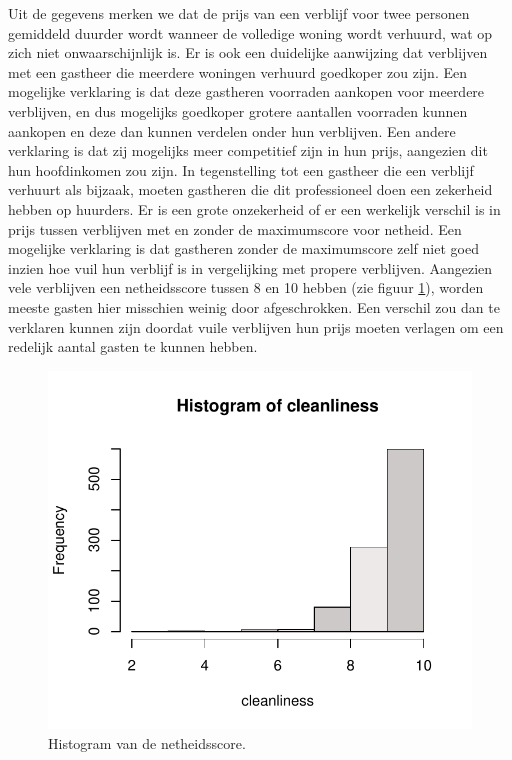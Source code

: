 \documentclass[a4paper]{kulakarticle}
\begin{document}
	Uit de gegevens merken we dat de prijs van een verblijf voor twee personen gemiddeld duurder wordt wanneer de volledige woning wordt verhuurd, wat op zich niet onwaarschijnlijk is.
	Er is ook een duidelijke aanwijzing dat verblijven met een gastheer die meerdere woningen verhuurd goedkoper zou zijn. Een mogelijke verklaring is dat deze gastheren voorraden aankopen voor meerdere verblijven, en dus mogelijks goedkoper grotere aantallen voorraden kunnen aankopen en deze dan kunnen verdelen onder hun verblijven. Een andere verklaring is dat zij mogelijks meer competitief zijn in hun prijs, aangezien dit hun hoofdinkomen zou zijn. In tegenstelling tot een gastheer die een verblijf verhuurt als bijzaak, moeten gastheren die dit professioneel doen een zekerheid hebben op huurders.
	Er is een grote onzekerheid of er een werkelijk verschil is in prijs tussen verblijven met en zonder de maximumscore voor netheid. Een mogelijke verklaring is dat gastheren zonder de maximumscore zelf niet goed inzien hoe vuil hun verblijf is in vergelijking met propere verblijven. Aangezien vele verblijven een netheidsscore tussen 8 en 10 hebben (zie figuur \ref{fig:cleanliness}), worden meeste gasten hier misschien weinig door afgeschrokken. Een verschil zou dan te verklaren kunnen zijn doordat vuile verblijven hun prijs moeten verlagen om een redelijk aantal gasten te kunnen hebben.
	
	\begin{figure}
		\centering
		\includegraphics{Figuren/cleanliness_hist.pdf}
		\caption{Histogram van de netheidsscore.}
		\label{fig:cleanliness}
	\end{figure}
	
\end{document}
